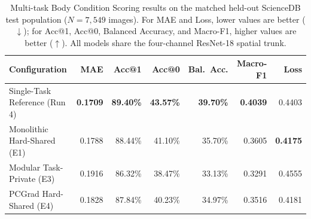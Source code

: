 \begin{table}[htbp]
\centering\small
\caption[Multi-task Body Condition Scoring results]{Multi-task Body Condition Scoring results on the matched held-out ScienceDB test population ($N = 7{,}549$ images). For MAE and Loss, lower values are better ($\downarrow$); for Acc@1, Acc@0, Balanced Accuracy, and Macro-F1, higher values are better ($\uparrow$). All models share the four-channel ResNet-18 spatial trunk.}
\label{tab:mtl_bcs_results}
\setlength{\tabcolsep}{2pt}
\begin{tabular}{lrrrrrr}
\toprule
\textbf{Configuration} & \textbf{MAE} & \textbf{Acc@1} & \textbf{Acc@0} & \textbf{Bal.~Acc.} & \textbf{Macro-F1} & \textbf{Loss} \\
\midrule
Single-Task Reference (Run 4) & \textbf{0.1709} & \textbf{89.40\%} & \textbf{43.57\%} & \textbf{39.70\%} & \textbf{0.4039} & 0.4403 \\
Monolithic Hard-Shared (E1) & 0.1788 & 88.44\% & 41.10\% & 35.70\% & 0.3605 & \textbf{0.4175} \\
Modular Task-Private (E3) & 0.1916 & 86.32\% & 38.47\% & 33.13\% & 0.3291 & 0.4555 \\
PCGrad Hard-Shared (E4) & 0.1828 & 87.84\% & 40.23\% & 34.97\% & 0.3516 & 0.4181 \\
\bottomrule
\end{tabular}
\end{table}
